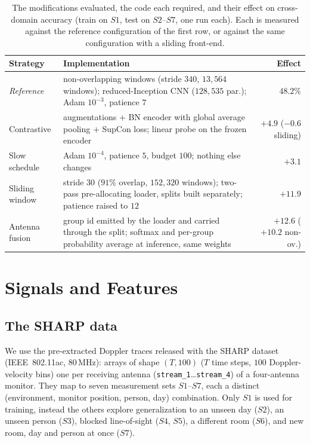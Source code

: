 \begin{table}[t]
  \centering
  \caption{The modifications evaluated, the code each required, and their effect
  on cross-domain accuracy (train on $S1$, test on $S2$--$S7$, one run each).
  Each is measured against the reference configuration of the first row, or
  against the same configuration with a sliding front-end.}
  \label{tab:versions}
  \setlength{\tabcolsep}{3pt}
  \footnotesize
  \begin{tabular}{@{}lp{}r@{}}
    \toprule
    Strategy & Implementation & Effect\\
    \midrule
    \emph{Reference} &
      non-overlapping windows (stride $340$, $13{,}564$ windows);
      reduced-Inception CNN ($128{,}535$ par.); Adam $10^{-3}$, patience $7$
      & $48.2\%$\\[2pt]
    Contrastive &
      augmentations $+$ BN encoder with global average pooling $+$ SupCon loss;
      linear probe on the frozen encoder
      & $+4.9$ \newline ($-0.6$ sliding)\\[2pt]
    Slow schedule &
      Adam $10^{-4}$, patience $5$, budget $100$; nothing else changes
      & $+3.1$\\[2pt]
    Sliding window &
      stride $30$ ($91\%$ overlap, $152{,}320$ windows); two-pass
      pre-allocating loader, splits built separately; patience raised to $12$
      & $+11.9$\\[2pt]
    Antenna fusion &
      group id emitted by the loader and carried through the split; softmax and
      per-group probability average at inference, same weights
      & $\mathbf{+12.6}$ \newline ($+10.2$ non-ov.)\\
    \bottomrule
  \end{tabular}
\end{table}

\section{Signals and Features}
\label{sec:model}

\subsection{The SHARP data}
We use the pre-extracted Doppler traces released with the SHARP
dataset~\cite{csidataset} (IEEE~802.11ac, $80$\,MHz): arrays of shape $(T,100)$
($T$ time steps, $100$ Doppler-velocity bins) one per receiving antenna
(\texttt{stream\_1}\dots\texttt{stream\_4}) of a four-antenna monitor. They map to
seven measurement sets $S1$--$S7$, each a distinct (environment, monitor
position, person, day) combination. Only $S1$ is used for training, instead the others
explore generalization to an unseen day ($S2$), an unseen person ($S3$), blocked
line-of-sight ($S4$, $S5$), a different room ($S6$), and new room, day and person
at once ($S7$).

